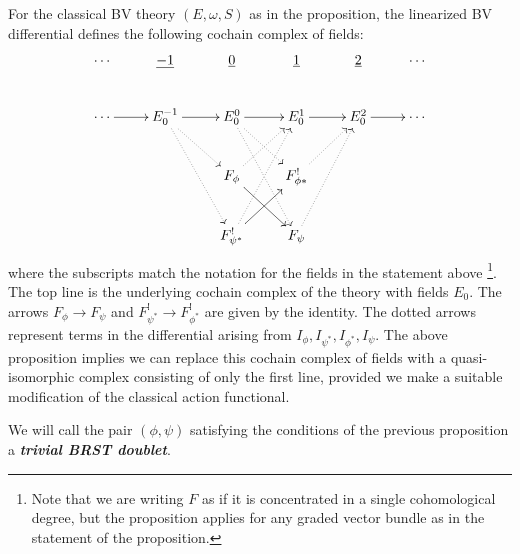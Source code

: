 \documentclass[10pt, oneside]{article}
\newcommand{\defterm}[1]{\textbf{\emph{#1}}}
\begin{document}
\begin{remark}
For the classical BV theory $(E, \omega, S)$ as in the proposition, the linearized BV differential defines the following cochain complex of fields:
\[\xymatrix{
\cdots & \ul{-1} & \ul{0} & \ul{1} & \ul{2} & \cdots \\
\cdots \ar[r] & E_0^{-1}\ar[r] \ar@{.>}[dr] \ar@{.>}[ddr] &E_0^0 \ar@{.>}[ddr] \ar@{.>}[dr]  \ar[r]  &E_0^1 \ar[r] &E_0^2 \ar[r] &\cdots \\
&&F_\phi \ar^{~}[dr]  \ar@{.>}[ur] &F^!_{\phi*}  \ar@{.>}[ur] && \\
&&F^!_{\psi^*} \ar^{~}[ur]  \ar@{.>}[uur]  &F_\psi  \ar@{.>}[uur] && \\
}\]
where the subscripts match the notation for the fields in the statement above \footnote{Note that we are writing $F$ as if it is concentrated in a single cohomological degree, but the proposition applies for any graded vector bundle as in the statement of the proposition.}.  The top line is the underlying cochain complex of the theory with fields $E_0$. The arrows $F_\phi \to F_\psi$ and $F^!_{\psi^*} \to F^!_{\phi^*}$ are given by the identity. The dotted arrows represent terms in the differential arising from $I_\phi, I_{\psi^*}, I_{\phi^*}, I_{\psi}$. The above proposition implies we can replace this cochain complex of fields with a quasi-isomorphic complex consisting of only the first line, provided we make a suitable modification of the classical action functional. 
\end{remark}
\begin{remark}
We will call the pair $(\phi, \psi)$ satisfying the conditions of the previous proposition a \defterm{trivial BRST doublet}.
\end{remark}
\end{document}
